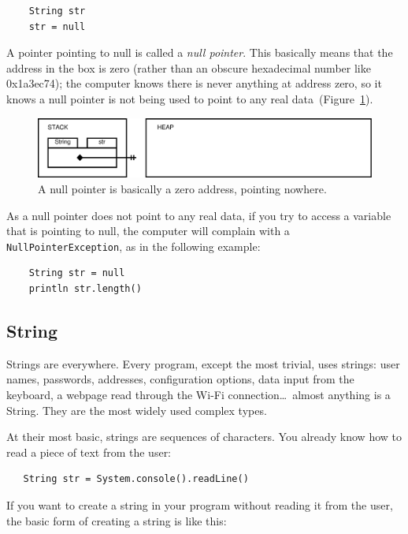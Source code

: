 \begin{verbatim}
    String str
    str = null
\end{verbatim}

A pointer pointing to null is called a \emph{null pointer}. This
basically means that the address in the box is zero (rather than an
obscure hexadecimal number like 0x1a3ec74); the computer
knows there is never anything at address zero, so it knows a null
pointer is not being used to point to any real
data~(Figure~\ref{fig:nullpiounter}).

\begin{figure}[htbp]
  \centering
  \includegraphics[width=\textwidth]{gfx/variables-string-null}
  \caption{A null pointer is basically a zero address, pointing nowhere.}
  \label{fig:nullpiounter}
\end{figure}

As a null pointer does not point to any real data, if you try to
access a variable that is pointing to null, the computer will complain
with a \verb+NullPointerException+, as in the following example: 

\begin{verbatim}
    String str = null
    println str.length()
\end{verbatim}



\subsection{String}
\label{sec:string}

Strings are everywhere. Every program, except the most trivial, uses
strings: user names, passwords, addresses, configuration options, data
input from the keyboard, a webpage read through the Wi-Fi
connection\ldots~almost anything is a String. They are the most widely
used complex types. 

At their most basic, strings are sequences of characters. You already
know how to read a piece of text from the user: 

\begin{verbatim}
   String str = System.console().readLine()
\end{verbatim}

If you want to create a string in your program without reading it from
the user, the basic form of creating a string is like this: 

